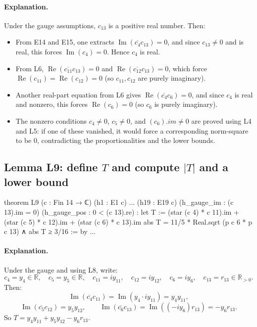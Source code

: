 \documentclass[11pt]{article}
\begin{document}
\paragraph{Explanation.}
Under the gauge assumptions, $c_{13}$ is a positive real number. Then:
\begin{itemize}
\item From E14 and E15, one extracts $\operatorname{Im}(\overline{c_4}c_{13})=0$, and since $c_{13}\neq 0$ and is real, this forces $\operatorname{Im}(c_4)=0$. Hence $c_4$ is real.
\item From L6, $\operatorname{Re}(\overline{c_{11}}c_{13})=0$ and $\operatorname{Re}(\overline{c_{12}}c_{13})=0$, which force $\operatorname{Re}(c_{11})=\operatorname{Re}(c_{12})=0$ (so $c_{11},c_{12}$ are purely imaginary).
\item Another real-part equation from L6 gives $\operatorname{Re}(\overline{c_4}c_6)=0$, and since $c_4$ is real and nonzero, this forces $\operatorname{Re}(c_6)=0$ (so $c_6$ is purely imaginary).
\item The nonzero conditions $c_4\neq 0$, $c_5\neq 0$, and $(c_6).im\neq 0$ are proved using L4 and L5: if one of these vanished, it would force a corresponding norm-square to be $0$, contradicting the proportionalities and the lower bounds.
\end{itemize}

\subsection*{Lemma L9: define $T$ and compute $|T|$ and a lower bound}

\begin{LeanCode}
theorem L9 (c : Fin 14 → ℂ)
  (h1 : E1 c) ... (h19 : E19 c)
  (h_gauge_im : (c 13).im = 0) (h_gauge_pos : 0 < (c 13).re) :
  let T := (star (c 4) * c 11).im + (star (c 5) * c 12).im + (star (c 6) * c 13).im
  abs T = 11/5 * Real.sqrt (p c 6 * p c 13) ∧
  abs T ≥ 3/16 := by
  ...
\end{LeanCode}

\paragraph{Explanation.}
Under the gauge and using L8, write:
\[
c_4=y_4\in\mathbb{R},\quad c_5=y_5\in\mathbb{R},\quad
c_{11}= i y_{11},\quad c_{12}= i y_{12},\quad c_6= i y_6,\quad c_{13}=r_{13}\in\mathbb{R}_{>0}.
\]
Then:
\[
\operatorname{Im}(\overline{c_4}c_{11}) = \operatorname{Im}(y_4 \cdot i y_{11}) = y_4 y_{11},
\]
\[
\operatorname{Im}(\overline{c_5}c_{12}) = y_5 y_{12},\qquad
\operatorname{Im}(\overline{c_6}c_{13}) = \operatorname{Im}((-i y_6) r_{13}) = -y_6 r_{13}.
\]
So $T = y_4 y_{11} + y_5 y_{12} - y_6 r_{13}$.
\end{document}
